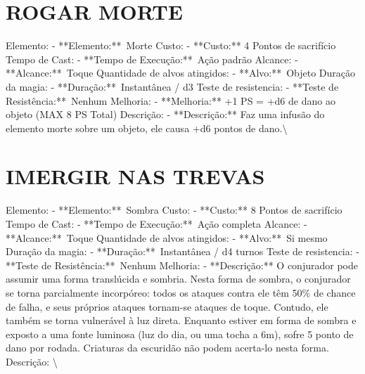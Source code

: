 \documentclass{article}%
\begin{document}
\section{ROGAR MORTE}%
\label{sec:ROGARMORTE}%
Elemento: {-} **Elemento:**~Morte\newline%
Custo: {-} **Custo:** 4 Pontos de sacrifício\newline%
Tempo de Cast: {-} **Tempo de Execução:**~Ação padrão\newline%
Alcance: {-} **Alcance:**~Toque\newline%
Quantidade de alvos atingidos: {-} **Alvo:**~Objeto\newline%
Duração da magia: {-} **Duração:**~Instantânea / d3\newline%
Teste de resistencia: {-} **Teste de Resistência:**~Nenhum\newline%
Melhoria: {-} **Melhoria:** +1 PS = +d6 de dano ao objeto (MAX 8 PS Total)\newline%
Descrição: {-} **Descrição:** Faz uma infusão do elemento morte sobre um objeto, ele causa +d6 pontos de dano.\textbackslash{}

%
\section{IMERGIR NAS TREVAS}%
\label{sec:IMERGIRNASTREVAS}%
Elemento: {-} **Elemento:**~Sombra\newline%
Custo: {-} **Custo:** 8 Pontos de sacrifício\newline%
Tempo de Cast: {-} **Tempo de Execução:**~Ação completa\newline%
Alcance: {-} **Alcance:**~Toque\newline%
Quantidade de alvos atingidos: {-} **Alvo:**~Si mesmo\newline%
Duração da magia: {-} **Duração:**~Instantânea / d4 turnos\newline%
Teste de resistencia: {-} **Teste de Resistência:**~Nenhum\newline%
Melhoria: {-} **Descrição:** O conjurador pode assumir uma forma translúcida e sombria. Nesta forma de sombra, o conjurador se torna parcialmente incorpóreo: todos os ataques contra ele têm 50\% de chance de falha, e seus próprios ataques tornam{-}se ataques de toque. Contudo, ele também se torna vulnerável à luz direta. Enquanto estiver em forma de sombra e exposto a uma fonte luminosa (luz do dia, ou uma tocha a 6m), sofre 5 ponto de dano por rodada. Criaturas da escuridão não podem acerta{-}lo nesta forma.\newline%
Descrição: \textbackslash{}
\end{document}
